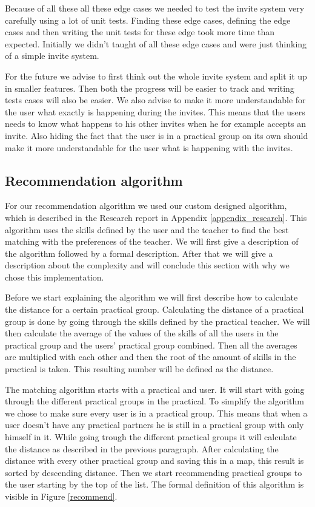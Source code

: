 Because of all these all these edge cases we needed to test the invite system very carefully using a lot of unit tests.
Finding these edge cases, defining the edge cases and then writing the unit tests for these edge took more time than expected.
Initially we didn't taught of all these edge cases and were just thinking of a simple invite system.

For the future we advise to first think out the whole invite system and split it up in smaller features.
Then both the progress will be easier to track and writing tests cases will also be easier.
We also advise to make it more understandable for the user what exactly is happening during the invites.
This means that the users needs to know what happens to his other invites when he for example accepts an invite.
Also hiding the fact that the user is in a practical group on its own should make it more understandable for the user what is happening with the invites.

\subsection{Recommendation algorithm}
\label{sec:algorithm}
For our recommendation algorithm we used our custom designed algorithm, which is described in the Research report in Appendix \ref{appendix_research}.
This algorithm uses the skills defined by the user and the teacher to find the best matching with the preferences of the teacher.
We will first give a description of the algorithm followed by a formal description.
After that we will give a description about the complexity and will conclude this section with why we chose this implementation.

Before we start explaining the algorithm we will first describe how to calculate the distance for a certain practical group.
Calculating the distance of a practical group is done by going through the skills defined by the practical teacher.
We will then calculate the average of the values of the skills of all the users in the practical group and the users' practical group combined.
Then all the averages are multiplied with each other and then the root of the amount of skills in the practical is taken.
This resulting number will be defined as the distance.

The matching algorithm starts with a practical and user.
It will start with going through the different practical groups in the practical.
To simplify the algorithm we chose to make sure every user is in a practical group.
This means that when a user doesn't have any practical partners he is still in a practical group with only himself in it.
While going trough the different practical groups it will calculate the distance as described in the previous paragraph.
After calculating the distance with every other practical group and saving this in a map, this result is sorted by descending distance.
Then we start recommending practical groups to the user starting by the top of the list.
The formal definition of this algorithm is visible in Figure \ref{recommend}.

